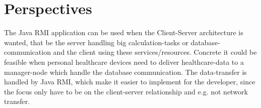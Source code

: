 \documentclass[Main]{subfiles}
\begin{document}
\section{Perspectives}
The Java RMI application can be used when the Client-Server architecture is wanted, that be the server handling big calculation-tasks or database-communication and the client using these services/resources. Concrete it could be feasible when personal healthcare devices need to deliver healthcare-data to a manager-node which handle the database communication. The data-transfer is handled by Java RMI, which make it easier to implement for the developer, since the focus only have to be on the client-server relationship and e.g. not network transfer. 
\end{document}
